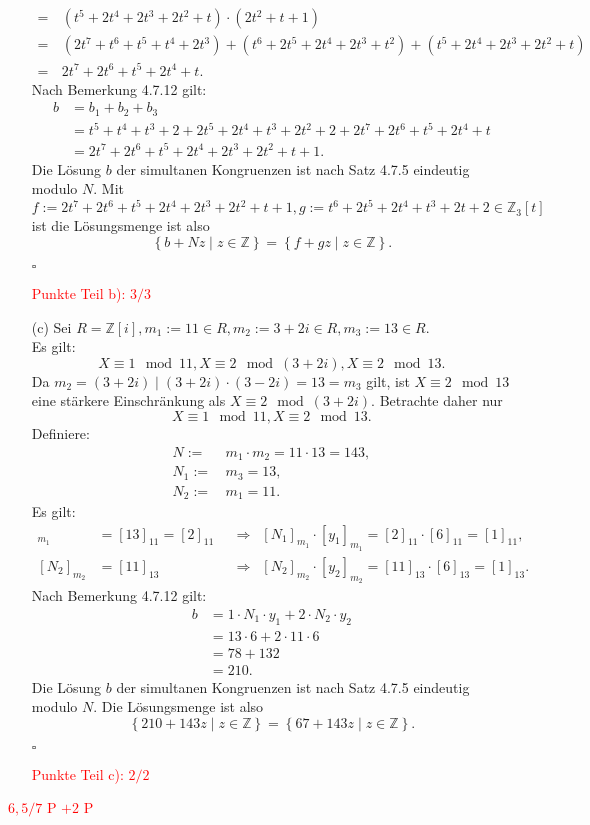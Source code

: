 \documentclass[12pt]{article}
\newcommand{\corr}[1]{\textcolor{red}{#1}}
\newcommand{\QED}{\begin{flushright} $\square$ \end{flushright}}
\newcommand{\df}{\enspace\Longrightarrow\enspace}
\begin{document}
\begin{enumerate}
\begin{align*}
		=&\,(t^5+2t^4+2t^3+2t^2+t)\cdot(2t^2+t+1) \\
		=&\,(2t^7+t^6+t^5+t^4+2t^3)+(t^6+2t^5+2t^4+2t^3+t^2)+(t^5+2t^4+2t^3+2t^2+t) \\
		=&\,2t^7+2t^6+t^5+2t^4+t.
	\end{align*}
	Nach Bemerkung 4.7.12 gilt:
	\begin{align*}
		b&=b_1+b_2+b_3 \\
		&=t^5+t^4+t^3+2+2t^5+2t^4+t^3+2t^2+2+2t^7+2t^6+t^5+2t^4+t \\
		&=2t^7+2t^6+t^5+2t^4+2t^3+2t^2+t+1.
	\end{align*}
	Die Lösung $b$ der simultanen Kongruenzen ist nach Satz 4.7.5 eindeutig modulo $N$. Mit $f:=2t^7+2t^6+t^5+2t^4+2t^3+2t^2+t+1,g:=t^6+2t^5+2t^4+t^3+2t+2\in\mathbb{Z}_3[t]$ ist die Lösungsmenge ist also
	$$\left\{b+Nz\mid z\in\mathbb{Z}\right\}=\left\{f+gz\mid z\in\mathbb{Z}\right\}.$$
	\QED
\corr{Punkte Teil b): $3/3$}
	
	\item[(c)] Sei $R=\mathbb{Z}[i],m_1:=11\in R,m_2:=3+2i\in R,m_3:=13\in R$. \\
	Es gilt: $$X\equiv1\mod11,X\equiv2\mod(3+2i),X\equiv2\mod13.$$
	Da $m_2=(3+2i)\mid(3+2i)\cdot(3-2i)=13=m_3$ gilt, ist $X\equiv2\mod13$ eine stärkere Einschränkung als $X\equiv2\mod(3+2i)$. Betrachte daher nur $$X\equiv1\mod11,X\equiv2\mod13.$$
	Definiere:
	\begin{align*}
		N:=&\,m_1\cdot m_2=11\cdot13=143, \\
		N_1:=&\,m_3=13, \\
		N_2:=&\,m_1=11.
	\end{align*}
	Es gilt:
	\begin{align*}
		[N_1]_{m_1}&=[13]_{11}=[2]_{11}&\df[N_1]_{m_1}\cdot[y_1]_{m_1}=[2]_{11}\cdot[6]_{11}=[1]_{11}, \\
		[N_2]_{m_2}&=[11]_{13}&\df[N_2]_{m_2}\cdot[y_2]_{m_2}=[11]_{13}\cdot[6]_{13}=[1]_{13}.
	\end{align*}
	Nach Bemerkung 4.7.12 gilt:
	\begin{align*}
		b&=1\cdot N_1\cdot y_1+2\cdot N_2\cdot y_2 \\
		&=13\cdot6+2\cdot11\cdot6 \\
		&=78+132 \\
		&=210.
	\end{align*}
	Die Lösung $b$ der simultanen Kongruenzen ist nach Satz 4.7.5 eindeutig modulo $N$. Die Lösungsmenge ist also
	$$\left\{210+143z\mid z\in\mathbb{Z}\right\}=\left\{67+143z\mid z\in\mathbb{Z}\right\}.$$
	\QED
\corr{Punkte Teil c): $2/2$}
\end{enumerate}
\corr{$6,5/7$ P $+2$ P}
\end{document}
